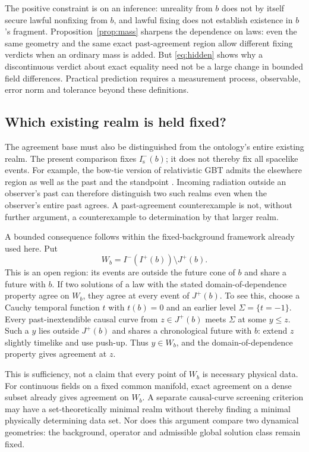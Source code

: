 \documentclass[11pt]{article}
\theoremstyle{definition}
\newcommand{\Is}{I^-_{\mathrm s}}
\begin{document}
The positive constraint is on an inference: unreality from $b$ does not by
itself secure lawful nonfixing from $b$, and lawful fixing does not establish
existence in $b$'s fragment. Proposition~\ref{prop:mass} sharpens the dependence
on laws: even the same geometry and the same exact past-agreement region
allow different fixing verdicts when an ordinary mass is added. But
\eqref{eq:hidden} shows why a discontinuous verdict about exact equality need
not be a large change in bounded field differences. Practical prediction
requires a measurement process, observable, error norm and tolerance beyond
these definitions.

\subsection{Which existing realm is held fixed?}\label{sec:realm}

The agreement base must also be distinguished from the ontology's entire
existing realm. The present comparison fixes $\Is(b)$; it does not thereby
fix all spacelike events. For example, the bow-tie version of relativistic
GBT admits the elsewhere region as well as the past and the standpoint
\citep[Chap.~9]{CR2018}. Incoming radiation outside an observer's past can
therefore distinguish two such realms even when the observer's entire past
agrees. A past-agreement counterexample is not, without further argument, a
counterexample to determination by that larger realm.

A bounded consequence follows within the fixed-background framework already
used here. Put
\[
 W_b=I^-(I^+(b))\setminus J^+(b).
\]
This is an open region: its events are outside the future cone of $b$ and
share a future with $b$. If two solutions of a law with the stated
domain-of-dependence property agree on $W_b$, they agree at every event of
$J^+(b)$. To see this, choose a Cauchy temporal function $t$ with $t(b)=0$
and an earlier level $\Sigma=\{t=-1\}$. Every past-inextendible causal curve
from $z\in J^+(b)$ meets $\Sigma$ at some $y\leq z$. Such a $y$ lies outside
$J^+(b)$ and shares a chronological future with $b$: extend $z$ slightly
timelike and use push-up. Thus $y\in W_b$, and the domain-of-dependence
property gives agreement at $z$.

This is sufficiency, not a claim that every point of $W_b$ is necessary
physical data. For continuous fields on a fixed common manifold, exact
agreement on a dense subset already gives agreement on $W_b$. A separate
causal-curve screening criterion may have a set-theoretically minimal
realm without thereby finding a minimal physically determining data set.
Nor does this argument compare two dynamical geometries: the background,
operator and admissible global solution class remain fixed.
\end{document}
